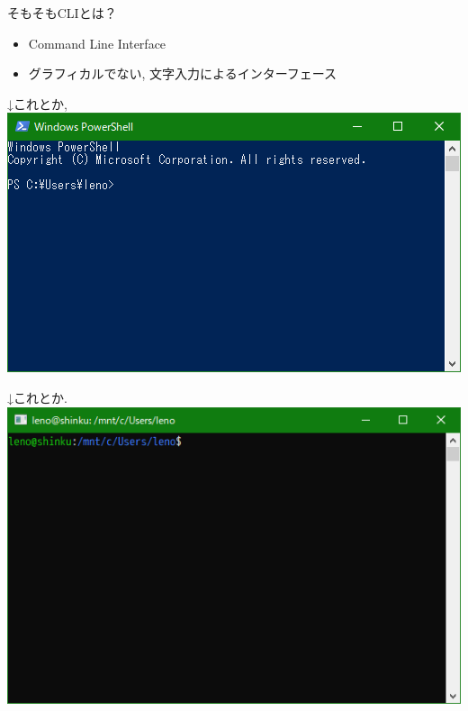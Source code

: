 \documentclass[uplatex, dvipdfmx, unicode]{beamer}
\begin{document}
\begin{frame}
  そもそもCLIとは？
  \begin{itemize}
    \item{Command Line Interface}
    \item{グラフィカルでない, 文字入力によるインターフェース}
  \end{itemize}
\end{frame}

\begin{frame}
  \centering
  \Huge{↓これとか,} \\
  \includegraphics[keepaspectratio, scale=.5]{./img/ps.png}
\end{frame}

\begin{frame}
  \centering
  \Huge{↓これとか.} \\
  \includegraphics[keepaspectratio, scale=.5]{./img/bash.png}
\end{frame}
\end{document}
